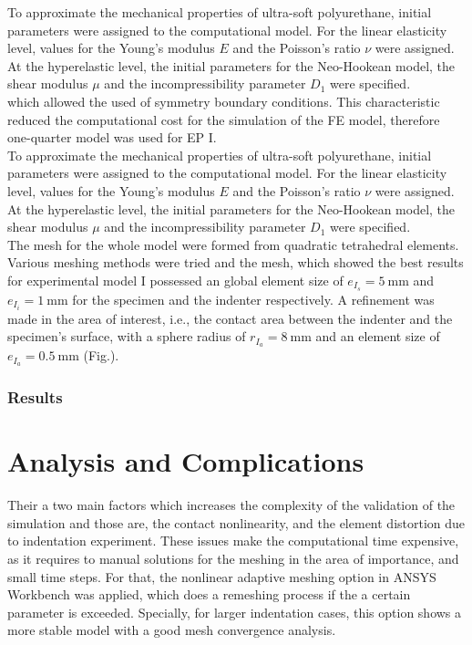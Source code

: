 
To approximate the mechanical properties of ultra-soft polyurethane, initial parameters were assigned 
to the computational model. For the linear elasticity level, values for the Young's modulus $E$ and the 
Poisson's ratio $\nu$ were assigned. At the hyperelastic level, the initial parameters for the Neo-Hookean model, 
the shear modulus $\mu$ and the incompressibility parameter $D_1$ were specified.\\ 

which allowed the used 
of symmetry boundary conditions. This characteristic reduced the computational cost for the simulation 
of the FE model, therefore one-quarter model was used for EP I.\\

To approximate the mechanical properties of ultra-soft polyurethane, initial parameters were assigned 
to the computational model. For the linear elasticity level, values for the Young's modulus $E$ and the 
Poisson's ratio $\nu$ were assigned. At the hyperelastic level, the initial parameters for the Neo-Hookean model, 
the shear modulus $\mu$ and the incompressibility parameter $D_1$ were specified.\\ 


The mesh for the whole model were formed from quadratic tetrahedral elements. 
Various meshing methods were tried and the mesh, which showed the best results for experimental model I 
possessed an global element size of $e_{I_s}=\SI{5}{\milli\meter}$ and $e_{I_i}=\SI{1}{\milli\meter}$ for the specimen 
and the indenter respectively. A refinement was made in the area of interest, i.e., the contact 
area between the indenter and the specimen's surface, with a sphere radius of 
$r_{I_a}=\SI{8}{\milli\meter}$ and an element size of $e_{I_a}=\SI{0.5}{\milli\meter}$ (Fig.). %

\subsubsection*{Results}

\section{Analysis and Complications}
Their a two main factors which increases the complexity of the validation of the simulation
and those are, the contact nonlinearity, and the element distortion due to indentation
 experiment. These issues make the computational time expensive, as it requires to manual 
 solutions for the meshing in the area of importance, and small time steps. 
 For that, 
 the nonlinear adaptive meshing option in ANSYS Workbench was applied, which does a remeshing
 process if the a certain parameter is exceeded.%
Specially, for larger indentation cases, this option shows a more stable model with a 
good mesh convergence analysis.

